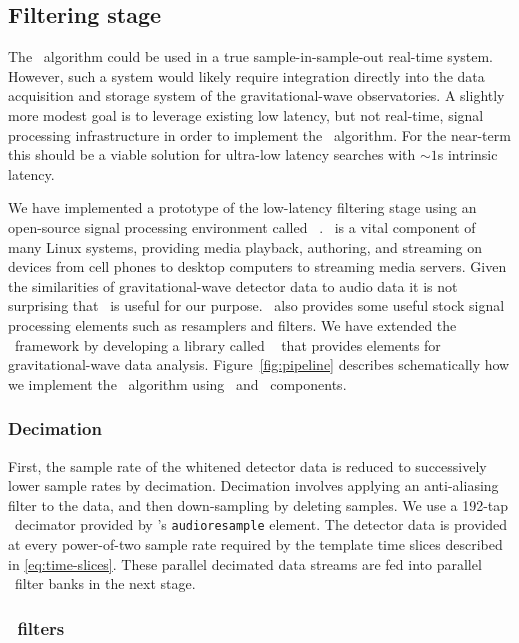 \subsection{Filtering stage}

The \lloid\ algorithm could be used in a true sample-in-sample-out real-time
system.  However, such a system would likely require integration directly into
the data acquisition and storage system of the gravitational-wave
observatories.  A slightly more modest goal is to leverage existing low
latency, but not real-time, signal processing infrastructure in order to
implement the \lloid\ algorithm.  For the near-term this should be a viable 
solution for ultra-low latency searches with $\sim 1$s intrinsic latency.

We have implemented a prototype of the low-latency filtering stage using an
open-source signal processing environment called \gstreamer\ \cite{gstreamer}.
\gstreamer\ is a vital component of many Linux systems, providing media
playback, authoring, and streaming on devices from cell phones to desktop
computers to streaming media servers.  Given the similarities of
gravitational-wave detector data to audio data it is not surprising that
\gstreamer\ is
useful for our purpose. \gstreamer\ also provides some useful stock signal
processing elements such as resamplers and filters.  We have extended the
\gstreamer\ framework by developing a library called \gstlal{}~\cite{gstlal}
that provides elements for gravitational-wave data analysis.
Figure~\ref{fig:pipeline} describes schematically how we implement the \lloid\
algorithm using \gstlal\ and \gstreamer\ components.

\subsubsection{Decimation}

First, the sample rate of the whitened detector data is reduced to successively
lower sample rates by decimation.  Decimation involves applying an anti-aliasing
filter to the data, and then down-sampling by deleting samples.  We use a
192-tap \fir\ decimator provided by \gstreamer{}'s {\tt audioresample}
element.  The detector data is provided at every power-of-two sample rate
required by the template time slices described in \eqref{eq:time-slices}.  These
parallel decimated data streams are fed into parallel \fir\ filter banks in the
next stage.

\subsubsection{\fir\ filters}

